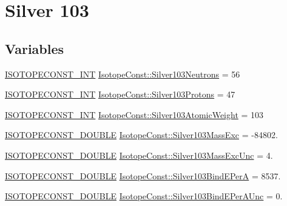 \hypertarget{group___isotope_const-_silver-_ag103}{}\section{Silver 103}
\label{group___isotope_const-_silver-_ag103}
\subsection*{Variables}
\begin{DoxyCompactItemize}
\item 
\mbox{\hyperlink{group___isotope_const-_macros_ga5f18360b3e99483a35c32d789e62621c}{I\+S\+O\+T\+O\+P\+E\+C\+O\+N\+S\+T\+\_\+\+I\+NT}} \mbox{\hyperlink{group___isotope_const-_silver-_ag103_ga22a227b2dc6059d8aeef4af6a2bf69c6}{Isotope\+Const\+::\+Silver103\+Neutrons}} = 56
\item 
\mbox{\hyperlink{group___isotope_const-_macros_ga5f18360b3e99483a35c32d789e62621c}{I\+S\+O\+T\+O\+P\+E\+C\+O\+N\+S\+T\+\_\+\+I\+NT}} \mbox{\hyperlink{group___isotope_const-_silver-_ag103_ga59fbab32259e7cba45c4a9f2bd5eafa8}{Isotope\+Const\+::\+Silver103\+Protons}} = 47
\item 
\mbox{\hyperlink{group___isotope_const-_macros_ga5f18360b3e99483a35c32d789e62621c}{I\+S\+O\+T\+O\+P\+E\+C\+O\+N\+S\+T\+\_\+\+I\+NT}} \mbox{\hyperlink{group___isotope_const-_silver-_ag103_gabd46e3aae2962c272d99d4e2161e0dcf}{Isotope\+Const\+::\+Silver103\+Atomic\+Weight}} = 103
\item 
\mbox{\hyperlink{group___isotope_const-_macros_ga8f45a7272ce02c0b4c65c44636ed719a}{I\+S\+O\+T\+O\+P\+E\+C\+O\+N\+S\+T\+\_\+\+D\+O\+U\+B\+LE}} \mbox{\hyperlink{group___isotope_const-_silver-_ag103_ga427e8c7e97a84a1f3458ddbed5f6f5f2}{Isotope\+Const\+::\+Silver103\+Mass\+Exc}} = -\/84802.
\item 
\mbox{\hyperlink{group___isotope_const-_macros_ga8f45a7272ce02c0b4c65c44636ed719a}{I\+S\+O\+T\+O\+P\+E\+C\+O\+N\+S\+T\+\_\+\+D\+O\+U\+B\+LE}} \mbox{\hyperlink{group___isotope_const-_silver-_ag103_gaf868657cacebe4aaaefcf1a81887349b}{Isotope\+Const\+::\+Silver103\+Mass\+Exc\+Unc}} = 4.
\item 
\mbox{\hyperlink{group___isotope_const-_macros_ga8f45a7272ce02c0b4c65c44636ed719a}{I\+S\+O\+T\+O\+P\+E\+C\+O\+N\+S\+T\+\_\+\+D\+O\+U\+B\+LE}} \mbox{\hyperlink{group___isotope_const-_silver-_ag103_ga8a5eccbeb32da677bb232882e626e744}{Isotope\+Const\+::\+Silver103\+Bind\+E\+PerA}} = 8537.
\item 
\mbox{\hyperlink{group___isotope_const-_macros_ga8f45a7272ce02c0b4c65c44636ed719a}{I\+S\+O\+T\+O\+P\+E\+C\+O\+N\+S\+T\+\_\+\+D\+O\+U\+B\+LE}} \mbox{\hyperlink{group___isotope_const-_silver-_ag103_gafbe1f10b934287b27356163eed8e91a5}{Isotope\+Const\+::\+Silver103\+Bind\+E\+Per\+A\+Unc}} = 0.

\end{DoxyCompactItemize}
